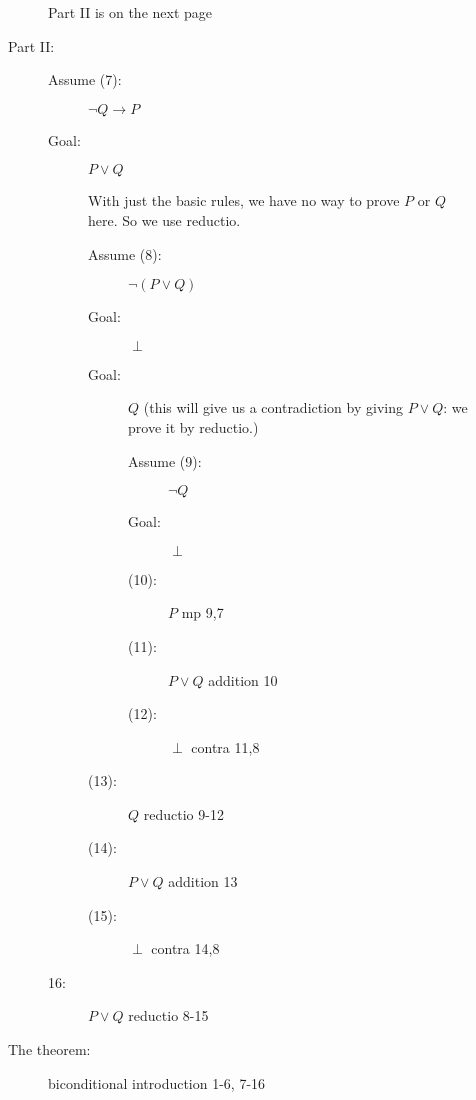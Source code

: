 \documentclass[12pt]{article}
\begin{document}
\begin{description}
\begin{description}
\begin{description}
\end{description}

Part II is on the next page

\newpage

\item[Part II:]

\begin{description}

\item[Assume (7):]  $\neg Q \rightarrow P$

\item[Goal:]  $P \vee Q$

With just the basic rules, we have no way to prove $P$ or $Q$ here.  So we use
reductio.

\begin{description} 

\item[Assume (8):] $\neg(P \vee Q)$

\item[Goal:]  $\perp$

\item[Goal:]  $Q$ (this will give us a contradiction by giving $P \vee Q$:  we prove it
by reductio.)

\begin{description}

\item[Assume (9):]  $\neg Q$

\item[Goal:]  $\perp$

\item[(10):]  $P$ mp 9,7

\item[(11):]  $P \vee Q$ addition 10

\item[(12):]  $\perp$  contra 11,8


\end{description}

\item[(13):]  $Q$ reductio 9-12

\item [(14):]  $P \vee Q$  addition 13

\item[(15):]  $\perp$ contra 14,8



\end{description}

\item[16:]  $P \vee Q$ reductio 8-15
\end{description}

\item[The theorem:]  biconditional introduction 1-6, 7-16

\end{description}

\end{description}
\end{document}
